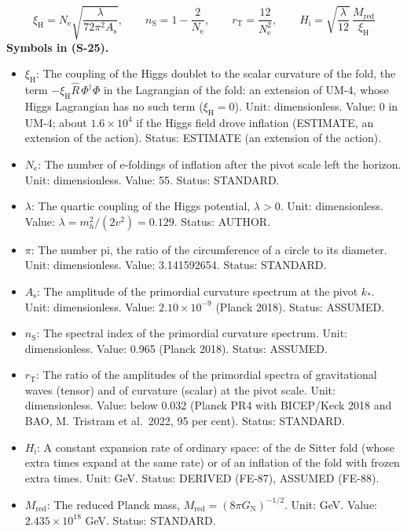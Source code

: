 \documentclass[
  10pt,
]{article}
\providecommand{\tightlist}{%
  \setlength{\itemsep}{0pt}\setlength{\parskip}{0pt}}
\begin{document}
\[
\xi_{\mathrm{H}} = N_{\mathrm{e}}\sqrt{\frac{\lambda}{72\pi^2A_{\mathrm{s}}}},\qquad n_{\mathrm{S}} = 1 - \frac{2}{N_{\mathrm{e}}},\qquad r_{\mathrm{T}} = \frac{12}{N_{\mathrm{e}}^2},\qquad
H_{\mathrm{i}} = \sqrt{\frac{\lambda}{12}}\,\frac{M_{\mathrm{red}}}{\xi_{\mathrm{H}}} \tag{S-25}
\] \textbf{Symbols in (S-25).}

\begin{itemize}
\tightlist
\item
  \(\xi_{\mathrm{H}}\): The coupling of the Higgs doublet to the scalar
  curvature of the fold, the term
  \(-\xi_{\mathrm{H}}\hat R\,\Phi^\dagger\Phi\) in the Lagrangian of the
  fold: an extension of UM-4, whose Higgs Lagrangian has no such term
  (\(\xi_{\mathrm{H}} = 0\)). Unit: dimensionless. Value: 0 in UM-4;
  about \(1.6\times10^4\) if the Higgs field drove inflation (ESTIMATE,
  an extension of the action). Status: ESTIMATE (an extension of the
  action).
\item
  \(N_{\mathrm{e}}\): The number of e-foldings of inflation after the
  pivot scale left the horizon. Unit: dimensionless. Value: 55. Status:
  STANDARD.
\item
  \(\lambda\): The quartic coupling of the Higgs potential,
  \(\lambda > 0\). Unit: dimensionless. Value:
  \(\lambda = m_h^2/(2v^2) = 0.129\). Status: AUTHOR.
\item
  \(\pi\): The number pi, the ratio of the circumference of a circle to
  its diameter. Unit: dimensionless. Value: 3.141592654. Status:
  STANDARD.
\item
  \(A_{\mathrm{s}}\): The amplitude of the primordial curvature spectrum
  at the pivot \(k_*\). Unit: dimensionless. Value:
  \(2.10\times10^{-9}\) (Planck 2018). Status: ASSUMED.
\item
  \(n_{\mathrm{S}}\): The spectral index of the primordial curvature
  spectrum. Unit: dimensionless. Value: 0.965 (Planck 2018). Status:
  ASSUMED.
\item
  \(r_{\mathrm{T}}\): The ratio of the amplitudes of the primordial
  spectra of gravitational waves (tensor) and of curvature (scalar) at
  the pivot scale. Unit: dimensionless. Value: below 0.032 (Planck PR4
  with BICEP/Keck 2018 and BAO, M. Tristram et al.~2022, 95 per cent).
  Status: STANDARD.
\item
  \(H_{\mathrm{i}}\): A constant expansion rate of ordinary space: of
  the de Sitter fold (whose extra times expand at the same rate) or of
  an inflation of the fold with frozen extra times. Unit: GeV. Status:
  DERIVED (FE-87), ASSUMED (FE-88).
\item
  \(M_{\mathrm{red}}\): The reduced Planck mass,
  \(M_{\mathrm{red}} = (8\pi G_{\mathrm{N}})^{-1/2}\). Unit: GeV. Value:
  \(2.435\times10^{18}\) GeV. Status: STANDARD.
\end{itemize}
\end{document}
